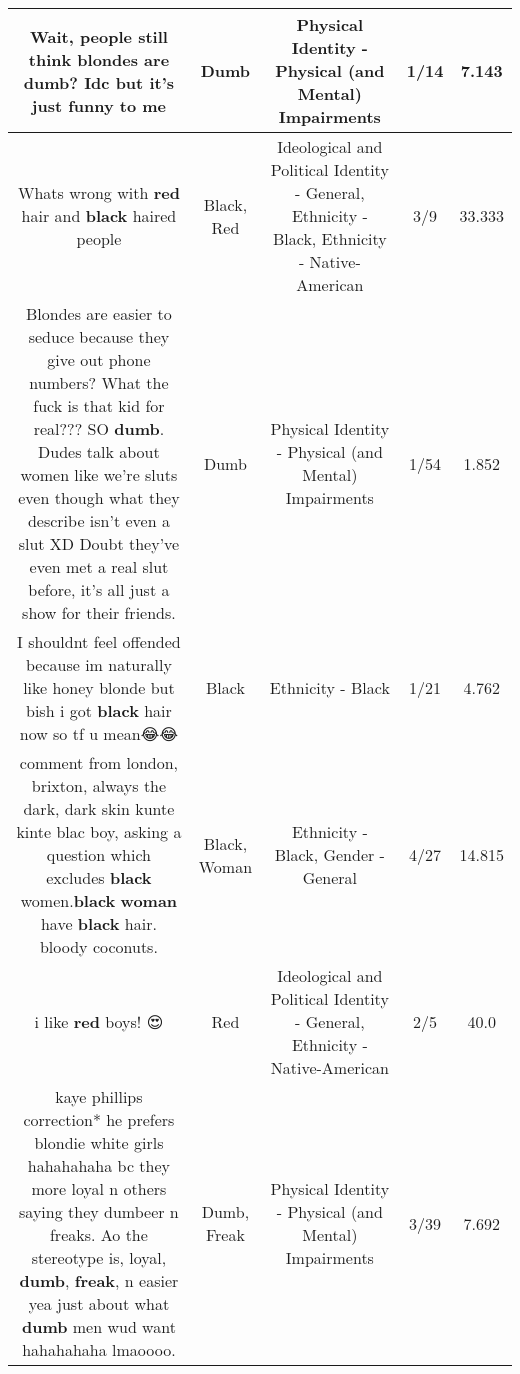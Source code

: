 \documentclass[11pt]{article}
\newlength\mylength
\begin{document}
\begin{center}
\begin{longtable}{|C{.65\mylength}|C{.30\mylength}|C{.12\mylength}|C{.12\mylength}|C{.12\mylength}|}
  \small Wait, people still think blondes are \textbf{dumb}? Idc but it's just funny to me\normalsize   & Dumb & Physical Identity - Physical (and Mental) Impairments & 1/14 & 7.143 \\  \hline
  \small Whats wrong with \textbf{r\textbf{ed}} hair and \textbf{black} haired people\normalsize   & Black, Red &  Ideological and Political Identity - General, Ethnicity - Black, Ethnicity - Native-American & 3/9 & 33.333 \\  \hline
  \small Blondes are easier to seduce because they give out phone numbers? What the fuck is that kid for real??? SO \textbf{dumb}. Dudes talk about women like we're sluts even though what they describe isn't even a slut XD Doubt they've even met a real slut before, it's all just a show for their friends.\normalsize   & Dumb & Physical Identity - Physical (and Mental) Impairments & 1/54 & 1.852 \\  \hline
  \small I shouldnt feel offended because im naturally like honey blonde but bish i got \textbf{black} hair now so tf u mean😂😂\normalsize   & Black & Ethnicity - Black & 1/21 & 4.762 \\  \hline
  \small comment from london, brixton, always the dark, dark skin kunte kinte blac boy, asking a question which excludes \textbf{black} women.\textbf{black} \textbf{woman} have \textbf{black} hair. bloody coconuts.\normalsize   & Black, Woman & Ethnicity - Black, Gender - General & 4/27 & 14.815 \\  \hline
  \small i like \textbf{r\textbf{ed}} boys! 😍\normalsize   & Red &  Ideological and Political Identity - General, Ethnicity - Native-American & 2/5 & 40.0 \\  \hline
  \small kaye phillips correction* he prefers blondie white girls hahahahaha bc they more loyal n others saying they dumbeer n freaks. Ao the stereotype is, loyal, \textbf{dumb}, \textbf{freak}, n easier yea just about what \textbf{dumb} men wud want hahahahaha lmaoooo.\normalsize   & Dumb, Freak & Physical Identity - Physical (and Mental) Impairments & 3/39 & 7.692 \\  \hline

\end{longtable}
\end{center}
\end{document}
